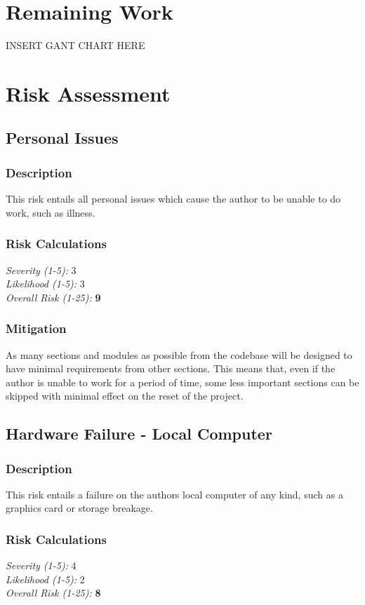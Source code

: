 \section{Remaining Work}
INSERT GANT CHART HERE



\section{Risk Assessment}
\subsection{Personal Issues}

\subsubsection{Description}
This risk entails all personal issues which cause the author to be unable to do work, such as illness.

\subsubsection{Risk Calculations}
\emph{Severity (1-5):} 3 \\
\emph{Likelihood (1-5):} 3 \\
\emph{Overall Risk (1-25):} \textbf{9}

\subsubsection{Mitigation}
As many sections and modules as possible from the codebase will be designed to have minimal requirements from other sections. This means that, even if the author is unable to work for a period of time, some less important sections can be skipped with minimal effect on the reset of the project.

\subsection{Hardware Failure - Local Computer}
\subsubsection{Description}
This risk entails a failure on the authors local computer of any kind, such as a graphics card or storage breakage.

\subsubsection{Risk Calculations}
\emph{Severity (1-5):} 4 \\
\emph{Likelihood (1-5):} 2 \\
\emph{Overall Risk (1-25):} \textbf{8}

